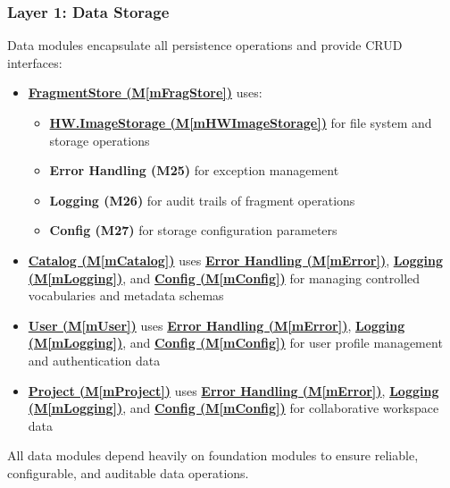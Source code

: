 \documentclass[12pt, titlepage]{article}
\newcommand{\mref}[1]{M\ref{#1}}
\begin{document}
\subsubsection{Layer 1: Data Storage}
Data modules encapsulate all persistence operations and provide CRUD interfaces:
\begin{itemize}
\item \hyperref[mFragStore]{\textbf{FragmentStore (\mref{mFragStore})}} uses:
  \begin{itemize}
  \item \hyperref[mHWImageStorage]{\textbf{HW.ImageStorage (\mref{mHWImageStorage})}} for file system and storage operations
  \item \textbf{Error Handling (M25)} for exception management
  \item \textbf{Logging (M26)} for audit trails of fragment operations
  \item \textbf{Config (M27)} for storage configuration parameters
  \end{itemize}
\item \hyperref[mCatalog]{\textbf{Catalog (\mref{mCatalog})}} uses \hyperref[mError]{\textbf{Error Handling (\mref{mError})}}, \hyperref[mLogging]{\textbf{Logging (\mref{mLogging})}}, and \hyperref[mConfig]{\textbf{Config (\mref{mConfig})}} for managing controlled vocabularies and metadata schemas
\item \hyperref[mUser]{\textbf{User (\mref{mUser})}} uses \hyperref[mError]{\textbf{Error Handling (\mref{mError})}}, \hyperref[mLogging]{\textbf{Logging (\mref{mLogging})}}, and \hyperref[mConfig]{\textbf{Config (\mref{mConfig})}} for user profile management and authentication data
\item \hyperref[mProject]{\textbf{Project (\mref{mProject})}} uses \hyperref[mError]{\textbf{Error Handling (\mref{mError})}}, \hyperref[mLogging]{\textbf{Logging (\mref{mLogging})}}, and \hyperref[mConfig]{\textbf{Config (\mref{mConfig})}} for collaborative workspace data
\end{itemize}

All data modules depend heavily on foundation modules to ensure reliable, configurable, and auditable data operations.
\end{document}
